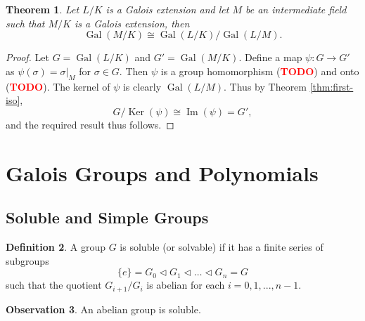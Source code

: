 \documentclass[12pt]{article}
\newtheorem{theorem}{Theorem}
\theoremstyle{definition}
\newtheorem{definition}[theorem]{Definition}
\newtheorem{observation}[theorem]{\textbf{Observation}}
\newcommand{\Gal}{\operatorname{Gal}}
\newcommand{\TODO}{\textbf{\textcolor{red}{TODO}}}
\begin{document}
\begin{theorem} \label{thm:correspondence-quotient}
    Let $L / K$ is a Galois extension and let $M$ be an intermediate field such that $M /K$ is a Galois extension, then 
    $$\Gal(M / K) \cong \Gal(L / K) / \Gal(L / M). $$
\end{theorem}

\begin{proof}
	Let $G = \Gal(L/K)$ and $G' = \Gal(M/K)$. Define a map $\psi: G \to G'$ as $\psi(\sigma) = \sigma | _M$ for $\sigma \in G$. Then $\psi$ is a group homomorphism (\TODO) and onto (\TODO). The kernel of $\psi$ is clearly $\Gal(L/M)$. Thus by Theorem \ref{thm:first-iso}, 
	$$G / \operatorname{Ker}(\psi) \cong \operatorname{Im}(\psi) = G',$$
	and the required result thus follows. 
\end{proof}

\section{Galois Groups and Polynomials} \label{sec:galois-groups-and-polynomials}


\subsection{Soluble and Simple Groups}

\begin{definition} \label{def:soluble}
    A group $G$ is soluble (or solvable) if it has a finite series of subgroups 
    $$ \{ e \} = G_0 \triangleleft G_1 \triangleleft \dots \triangleleft G_n = G$$
    such that the quotient $G_{i+1} / G_{i}$ is abelian for each $i = 0, 1, ...,  n - 1$.
\end{definition}

\begin{observation}
    An abelian group is soluble. 
\end{observation}
\end{document}
